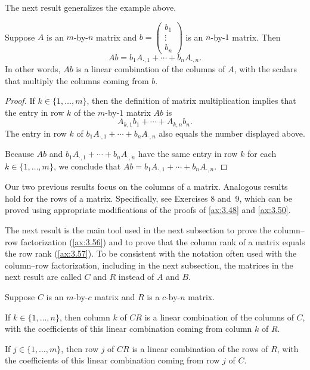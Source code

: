 The next result generalizes the example above.

\begin{result}\label{ax:3.50}
Suppose $A$ is an $m$-by-$n$ matrix and
$b=\begin{pmatrix} b_1\\ \vdots\\ b_n \end{pmatrix}$ is an $n$-by-$1$ matrix.
Then
\[ Ab = b_1A_{\cdot,1}+\cdots+b_nA_{\cdot,n}. \]
In other words, $Ab$ is a linear combination of the columns of $A$, with the
scalars that multiply the columns coming from $b$.
\end{result}

\begin{proof}
If $k\in\{1,\dots,m\}$, then the definition of matrix multiplication implies
that the entry in row $k$ of the $m$-by-$1$ matrix $Ab$ is
\[ A_{k,1}b_1+\cdots+A_{k,n}b_n. \]
The entry in row $k$ of $b_1A_{\cdot,1}+\cdots+b_nA_{\cdot,n}$ also equals the
number displayed above.

Because $Ab$ and $b_1A_{\cdot,1}+\cdots+b_nA_{\cdot,n}$ have the same entry in
row $k$ for each $k\in\{1,\dots,m\}$, we conclude that
$Ab=b_1A_{\cdot,1}+\cdots+b_nA_{\cdot,n}$.
\end{proof}

Our two previous results focus on the columns of a matrix. Analogous results
hold for the rows of a matrix. Specifically, see Exercises 8 and~9, which can
be proved using appropriate modifications of the proofs of \ref{ax:3.48} and
\ref{ax:3.50}.

The next result is the main tool used in the next subsection to prove the
column--row factorization (\ref{ax:3.56}) and to prove that the column rank of
a matrix equals the row rank (\ref{ax:3.57}). To be consistent with the
notation often used with the column--row factorization, including in the next
subsection, the matrices in the next result are called $C$ and $R$ instead of
$A$ and $B$.

\begin{result}\label{ax:3.51}
Suppose $C$ is an $m$-by-$c$ matrix and $R$ is a $c$-by-$n$ matrix.
\begin{parts}
\item If $k\in\{1,\dots,n\}$, then column $k$ of $CR$ is a linear combination
  of the columns of $C$, with the coefficients of this linear combination
  coming from column $k$ of $R$.
\item If $j\in\{1,\dots,m\}$, then row $j$ of $CR$ is a linear combination of
  the rows of $R$, with the coefficients of this linear combination coming
  from row $j$ of $C$.
\end{parts}
\end{result}

